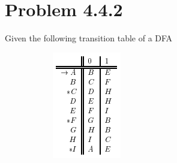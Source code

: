 \documentclass[20pt]{article} %
\begin{document}
\section{Problem 4.4.2}
Given the following transition table of a DFA
\begin{figure}[!htbp]
  	\centering
   	\begin{subfigure}[p]{0.15\linewidth}
    	\includegraphics[width=\linewidth]{./figures/HW5fig1.png}
   	\end{subfigure}
\end{figure} 
\end{document}
